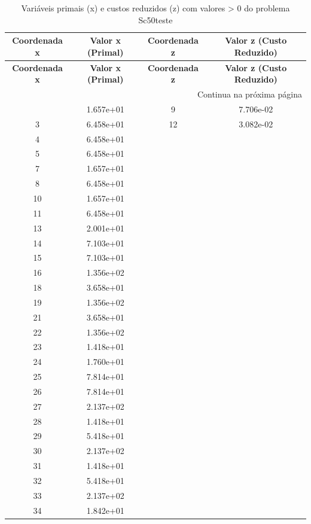 \documentclass[12pt]{article}
\begin{document}
\begin{longtable}{@{}cccc@{}}
\caption{Variáveis primais (x) e custos reduzidos (z) com valores > 0 do problema Sc50teste} \\
\toprule
\textbf{Coordenada x} & \textbf{Valor x (Primal)} & \textbf{Coordenada z} & \textbf{Valor z (Custo Reduzido)} \\
\midrule
\endfirsthead

\toprule
\textbf{Coordenada x} & \textbf{Valor x (Primal)} & \textbf{Coordenada z} & \textbf{Valor z (Custo Reduzido)} \\
\midrule
\endhead

\midrule \multicolumn{4}{r}{{Continua na próxima página}} \\ \midrule
\endfoot

\bottomrule
\endlastfoot
2 & 1.657e+01 & 9 & 7.706e-02 \\
3 & 6.458e+01 & 12 & 3.082e-02 \\
4 & 6.458e+01 &  &  \\
5 & 6.458e+01 &  &  \\
7 & 1.657e+01 &  &  \\
8 & 6.458e+01 &  &  \\
10 & 1.657e+01 &  &  \\
11 & 6.458e+01 &  &  \\
13 & 2.001e+01 &  &  \\
14 & 7.103e+01 &  &  \\
15 & 7.103e+01 &  &  \\
16 & 1.356e+02 &  &  \\
18 & 3.658e+01 &  &  \\
19 & 1.356e+02 &  &  \\
21 & 3.658e+01 &  &  \\
22 & 1.356e+02 &  &  \\
23 & 1.418e+01 &  &  \\
24 & 1.760e+01 &  &  \\
25 & 7.814e+01 &  &  \\
26 & 7.814e+01 &  &  \\
27 & 2.137e+02 &  &  \\
28 & 1.418e+01 &  &  \\
29 & 5.418e+01 &  &  \\
30 & 2.137e+02 &  &  \\
31 & 1.418e+01 &  &  \\
32 & 5.418e+01 &  &  \\
33 & 2.137e+02 &  &  \\
34 & 1.842e+01 &  &  \\

\end{longtable}
\end{document}
